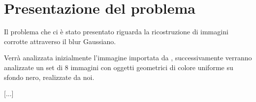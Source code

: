 \section{Presentazione del problema}

Il problema che ci è stato presentato riguarda la ricostruzione di 
immagini corrotte attraverso il blur Gaussiano.

Verrà analizzata inizialmente l'immagine  importata da
, successivamente verranno analizzate un set di 8 immagini con oggetti geometrici di colore uniforme su sfondo nero, realizzate da noi.

[...]